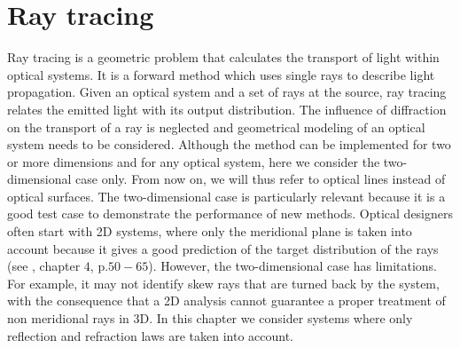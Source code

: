 \chapter{Ray tracing}\label{chap:raytracing}
Ray tracing is a geometric problem that calculates the transport of light within optical systems.
It is a forward method which uses single rays to describe light propagation.
Given an optical system and a set of rays at the source, ray tracing relates the emitted light with its output distribution. 
The influence of diffraction on the transport of a ray is neglected and geometrical modeling of an optical system needs to be considered.
Although the method can be implemented for two or more dimensions and for any optical system, here we consider the two-dimensional case only. 
From now on, we will thus refer to optical lines instead of optical surfaces.
The two-dimensional case is particularly relevant because it is a good test case to demonstrate the performance of new methods.
Optical designers often start with 2D systems, where only the meridional plane is taken into account because it gives a good prediction of the target distribution of the rays
(see \cite{winston2005nonimaging}, chapter $4$, p.$50-65$). However, the two-dimensional case has limitations. For example, it may not identify skew rays that are turned back by the system, with the consequence that a 2D analysis cannot guarantee a proper treatment of non meridional rays in 3D. In this chapter we consider systems where only reflection and refraction laws are taken into account.
